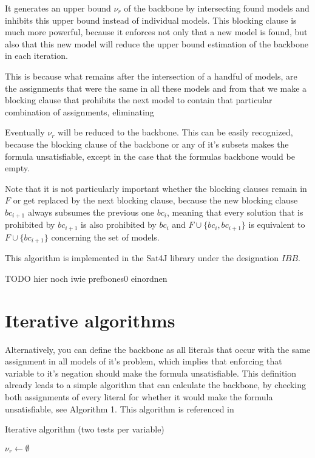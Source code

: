 It generates an upper bound $\nu_r$ of the backbone by intersecting found models and inhibits this upper bound instead of individual models. This blocking clause is much more powerful, because it enforces not only that a new model is found, but also that this new model will reduce the upper bound estimation of the backbone in each iteration. 

This is because what remains after the intersection of a handful of models, are the assignments that were the same in all these models and from that we make a blocking clause that prohibits the next model to contain that particular combination of assignments, eliminating 

Eventually $\nu_r$ will be reduced to the backbone. This can be easily recognized, because the blocking clause of the backbone or any of it's subsets makes the formula unsatisfiable, except in the case that the formulas backbone would be empty. 

Note that it is not particularly important whether the blocking clauses remain in $F$ or get replaced by the next blocking clause, because the new blocking clause $bc_{i+1}$ always subsumes the previous one $bc_i$, meaning that every solution that is prohibited by $bc_{i+1}$ is also prohibited by $bc_i$ and $F \cup \{bc_i , bc_{i+1}\}$ is equivalent to $F \cup \{bc_{i+1}\}$ concerning the set of models.

This algorithm is implemented in the Sat4J library under the designation $IBB$. 


TODO hier noch iwie prefbones0 einordnen

\section{Iterative algorithms}
Alternatively, you can define the backbone as all literals that occur with the same assignment in all models of it's problem, which implies that enforcing that variable to it's negation should make the formula unsatisfiable. This definition already leads to a simple algorithm that can calculate the backbone, by checking both assignments of every literal for whether it would make the formula unsatisfiable, see Algorithm 1. This algorithm is referenced in \cite{mjl10}
\begin{algorithm}
\caption{{\sc Iterative algorithm (two tests per variable)}}
\DontPrintSemicolon
{}
$\nu_r \gets \emptyset$\;
\;
\end{algorithm}

